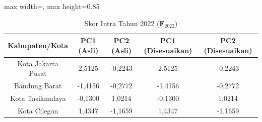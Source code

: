 \begin{table}[H]
\centering
\caption{Skor Intra Tahun 2022 ($\mathbf{F}_{2022}$)} \label{tab:sample1skor_intra_2022}
\begin{adjustbox}{max width=\textwidth, max height=0.85\textheight}
\begin{tabular}{|c|c|c|c|c|}
\hline
\textbf{Kabupaten/Kota} & \textbf{PC1 (Asli)} & \textbf{PC2 (Asli)} & \textbf{PC1 (Disesuaikan)} & \textbf{PC2 (Disesuaikan)} \\
\hline
Kota Jakarta Pusat & 2,5125 & -0,2243 & 2,5125 & -0,2243 \\
Bandung Barat & -1,4156 & -0,2772 & -1,4156 & -0,2772 \\
Kota Tasikmalaya & -0,1300 & 1,0214 & -0,1300 & 1,0214 \\
Kota Cilegon & 1,4347 & -1,1659 & 1,4347 & -1,1659 \\
\hline
\end{tabular}
\end{adjustbox}
\end{table}